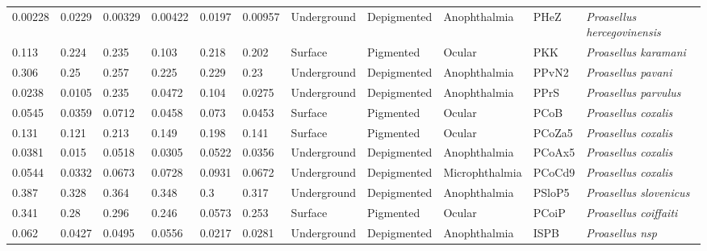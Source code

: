 \begin{tabular}{lllllllllll}
       0.00228 &              0.0229 &        0.00329 &        0.00422 &         0.0197 &        0.00957 &  Underground &  Depigmented &     Anophthalmia &     PHeZ &      \textit{Proasellus hercegovinensis} \\
         0.113 &               0.224 &          0.235 &          0.103 &          0.218 &          0.202 &      Surface &    Pigmented &           Ocular &      PKK &             \textit{Proasellus karamani} \\
         0.306 &                0.25 &          0.257 &          0.225 &          0.229 &           0.23 &  Underground &  Depigmented &     Anophthalmia &    PPvN2 &               \textit{Proasellus pavani} \\
        0.0238 &              0.0105 &          0.235 &         0.0472 &          0.104 &         0.0275 &  Underground &  Depigmented &     Anophthalmia &     PPrS &             \textit{Proasellus parvulus} \\
        0.0545 &              0.0359 &         0.0712 &         0.0458 &          0.073 &         0.0453 &      Surface &    Pigmented &           Ocular &     PCoB &              \textit{Proasellus coxalis} \\
         0.131 &               0.121 &          0.213 &          0.149 &          0.198 &          0.141 &      Surface &    Pigmented &           Ocular &   PCoZa5 &              \textit{Proasellus coxalis} \\
        0.0381 &               0.015 &         0.0518 &         0.0305 &         0.0522 &         0.0356 &  Underground &  Depigmented &     Anophthalmia &   PCoAx5 &              \textit{Proasellus coxalis} \\
        0.0544 &              0.0332 &         0.0673 &         0.0728 &         0.0931 &         0.0672 &  Underground &  Depigmented &   Microphthalmia &   PCoCd9 &              \textit{Proasellus coxalis} \\
         0.387 &               0.328 &          0.364 &          0.348 &            0.3 &          0.317 &  Underground &  Depigmented &     Anophthalmia &   PSloP5 &           \textit{Proasellus slovenicus} \\
         0.341 &                0.28 &          0.296 &          0.246 &         0.0573 &          0.253 &      Surface &    Pigmented &           Ocular &    PCoiP &            \textit{Proasellus coiffaiti} \\
         0.062 &              0.0427 &         0.0495 &         0.0556 &         0.0217 &         0.0281 &  Underground &  Depigmented &     Anophthalmia &     ISPB &                  \textit{Proasellus nsp} \\

\end{tabular}
